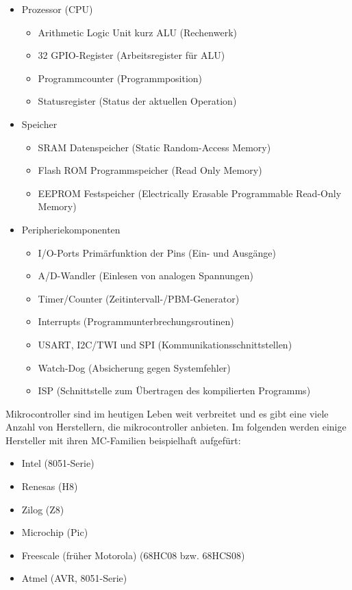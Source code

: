 \begin{itemize}
\item Prozessor (CPU)
\begin{itemize}
          \item Arithmetic Logic Unit kurz ALU (Rechenwerk)
          \item 32 GPIO-Register (Arbeitsregister f\"ur ALU)
          \item Programmcounter (Programmposition)
					\item Statusregister (Status der aktuellen Operation) 
\end{itemize}
\item Speicher
\begin{itemize}
          \item SRAM Datenspeicher (Static Random-Access Memory)
					\item Flash ROM Programmspeicher (Read Only Memory)
					\item EEPROM Festspeicher (Electrically Erasable Programmable Read-Only Memory)
\end{itemize}
\item Peripheriekomponenten
    \begin{itemize}
          \item I/O-Ports Prim\"arfunktion der Pins (Ein- und Ausg\"ange)
          \item A/D-Wandler (Einlesen von analogen Spannungen)
          \item Timer/Counter (Zeitintervall-/PBM-Generator)
					\item Interrupts (Programmunterbrechungsroutinen)
					\item USART, I2C/TWI und SPI (Kommunikationsschnittstellen)
					\item Watch-Dog (Absicherung gegen Systemfehler)
					\item ISP (Schnittstelle zum \"{U}bertragen des kompilierten Programms)
	\end{itemize}
\end{itemize}
Mikrocontroller sind im heutigen Leben weit verbreitet und es gibt eine viele Anzahl von Herstellern, die mikrocontroller anbieten. Im folgenden werden einige Hersteller mit ihren MC-Familien beispielhaft aufgef\"urt:
\begin{itemize}
\item Intel (8051-Serie)
\item Renesas (H8)
\item Zilog (Z8)
\item Microchip (Pic)
\item Freescale (fr\"uher Motorola) (68HC08 bzw. 68HCS08)
\item Atmel (AVR, 8051-Serie)
\end{itemize}
